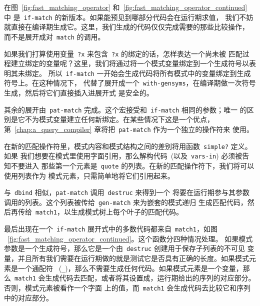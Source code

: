在图~\ref{fig:fast_matching_operator} 和~\ref{fig:fast_matching_operator_continued} 中
是~\verb|if-match| 的新版本。如果能预见到哪部分代码会在运行期求值，
我们不妨就直接在编译期生成它。这里，我们生成的代码仅仅完成需要的那些比较操作，
而不是展开成对~\verb|match| 的调用。

如果我们打算使用变量~\texttt{?x} 来包含~\texttt{?x} 的绑定的话，怎样表达一个尚未被
匹配过程建立绑定的变量呢？这里，我们将通过将一个模式变量绑定到一个生成符号以表明其未绑定。
所以~\texttt{if-match} 一开始会生成代码将所有模式中的变量绑定到生成符号上。在这种情况下，
代替了展开成一个~\texttt{with-gensyms}，在编译期做一次符号生成，然后将它们直接插入进展开式
是安全的。

其余的展开由~\texttt{pat-match} 完成。这个宏接受和~\texttt{if-match} 相同的参数；唯一
的区别是它不为模式变量建立任何新绑定。在某些情况下这是一个优点，
第~\ref{chap:a_query_compiler} 章将把~\texttt{pat-match} 作为一个独立的操作符来
使用。

在新的匹配操作符里，模式内容和模式结构之间的差别将用函数~\texttt{simple?} 定义。如果
我们想要在模式里使用字面引用，那么解构代码~(以及~\texttt{vars-in}) 必须被告知不要进入
那些第一个元素是~\texttt{quote} 的列表。在新的匹配操作符下，我们将可以使用列表作为
模式元素，只需简单地将它们引用起来。

与~\texttt{dbind} 相似，\texttt{pat-match} 调用~\texttt{destruc} 来得到一个
将要在运行期参与其参数调用的列表。这个列表被传给~\texttt{gen-match} 来为嵌套的模式递归
生成匹配代码，然后再传给~\texttt{match1}，以生成模式树上每个叶子的匹配代码。

最后出现在一个~\texttt{if-match} 展开式中的多数代码都来自~\texttt{match1}，如图
~\ref{fig:fast_matching_operator_continued}。这个函数分四种情况处理。
如果模式参数是一个生成符号，那么它是一个由~\texttt{destruc} 创建用于保存子列表的不可见
变量，并且所有我们需要在运行期做的就是测试它是否具有正确的长度。如果模式元素是一个通配符
~(\verb|_|)，那么不需要生成任何代码。如果模式元素是一个变量，那么~\texttt{match1}
会生成代码去匹配，或者将其设置成，运行期给出的序列的对应部分。否则，模式元素被看作一个字面
上的值，而~\texttt{match1} 会生成代码去比较它和序列中的对应部分。

